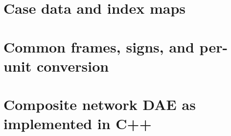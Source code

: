 \documentclass[12pt,a4paper]{article}
\begin{document}


\section{Case data and index maps}\label{sec:casedata}
\begin{table}[H]\centering\footnotesize
\caption{Case bus data --- \emph{identical input to both engines} (same
composition; no comparison columns by design).}

\end{table}

\begin{table}[H]\centering\footnotesize
\caption{Case branch series and charging (46 branches) --- identical input
to both engines.}

\end{table}

\section{Common frames, signs, and per-unit conversion}\label{sec:frames}


\section{Composite network DAE as implemented in C++}\label{sec:dae}

\end{document}
